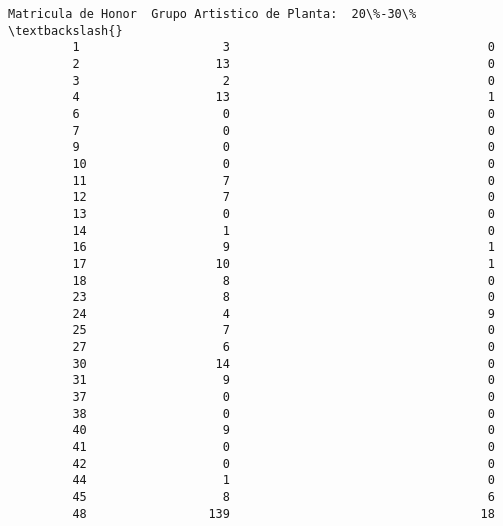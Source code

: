 \documentclass[11pt]{article}
\begin{document}
\begin{Verbatim}[commandchars=\\\{\}]
             Matricula de Honor  Grupo Artistico de Planta:  20\%-30\%  \textbackslash{}
         1                    3                                    0   
         2                   13                                    0   
         3                    2                                    0   
         4                   13                                    1   
         6                    0                                    0   
         7                    0                                    0   
         9                    0                                    0   
         10                   0                                    0   
         11                   7                                    0   
         12                   7                                    0   
         13                   0                                    0   
         14                   1                                    0   
         16                   9                                    1   
         17                  10                                    1   
         18                   8                                    0   
         23                   8                                    0   
         24                   4                                    9   
         25                   7                                    0   
         27                   6                                    0   
         30                  14                                    0   
         31                   9                                    0   
         37                   0                                    0   
         38                   0                                    0   
         40                   9                                    0   
         41                   0                                    0   
         42                   0                                    0   
         44                   1                                    0   
         45                   8                                    6   
         48                 139                                   18   
         

\end{Verbatim}
\end{document}
